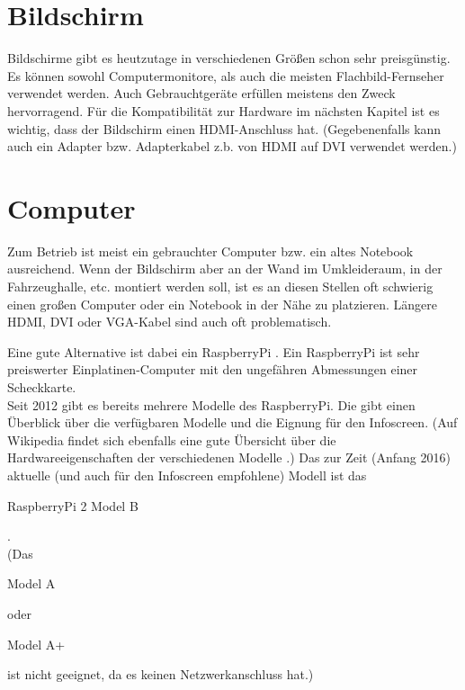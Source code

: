 \section{Bildschirm}
\label{sec:bildschirm}
Bildschirme gibt es heutzutage in verschiedenen Größen schon sehr preisgünstig.
Es können sowohl Computermonitore, als auch die meisten Flachbild-Fernseher verwendet werden.
Auch Gebrauchtgeräte erfüllen meistens den Zweck hervorragend.
Für die Kompatibilität zur Hardware im nächsten Kapitel ist es wichtig, dass der Bildschirm einen HDMI-Anschluss \cite{hdmi} hat.
(Gegebenenfalls kann auch ein Adapter bzw. Adapterkabel z.b. von HDMI auf DVI verwendet werden.)

\section{Computer}
\label{sec:rpi}
Zum Betrieb ist meist ein gebrauchter Computer bzw. ein altes Notebook ausreichend.
Wenn der Bildschirm aber an der Wand im Umkleideraum, in der Fahrzeughalle, etc. montiert werden soll,
ist es an diesen Stellen oft schwierig einen großen Computer oder ein Notebook in der Nähe zu platzieren.
Längere HDMI, DVI oder VGA-Kabel sind auch oft problematisch.

Eine gute Alternative ist dabei ein RaspberryPi \cite{rpi}. Ein RaspberryPi ist sehr preiswerter Einplatinen-Computer mit den ungefähren Abmessungen einer Scheckkarte.\\
Seit 2012 gibt es bereits mehrere Modelle des RaspberryPi. Die  gibt einen Überblick über die verfügbaren Modelle und die Eignung für den Infoscreen. 
(Auf Wikipedia findet sich ebenfalls eine gute Übersicht über die Hardwareeigenschaften der verschiedenen Modelle \cite{wikirpi}.)
Das zur Zeit (Anfang 2016) aktuelle (und auch für den Infoscreen empfohlene) Modell ist das \begin{em}RaspberryPi 2 Model B\end{em}.\\
(Das \begin{em}Model A\end{em} oder \begin{em}Model A+\end{em} ist nicht geeignet, da es keinen Netzwerkanschluss hat.)

